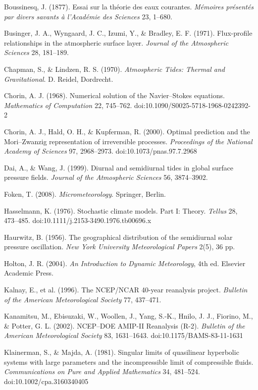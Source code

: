 \documentclass[11pt]{article}
\begin{document}
Boussinesq, J. (1877). Essai sur la th\'eorie des eaux courantes. \emph{M\'emoires pr\'esent\'es par divers savants \`a l'Acad\'emie des Sciences} 23, 1--680.

Businger, J. A., Wyngaard, J. C., Izumi, Y., \& Bradley, E. F. (1971). Flux-profile relationships in the atmospheric surface layer. \emph{Journal of the Atmospheric Sciences} 28, 181--189.

Chapman, S., \& Lindzen, R. S. (1970). \emph{Atmospheric Tides: Thermal and Gravitational}. D. Reidel, Dordrecht.

Chorin, A. J. (1968). Numerical solution of the Navier--Stokes equations. \emph{Mathematics of Computation} 22, 745--762. doi:10.1090/S0025-5718-1968-0242392-2

Chorin, A. J., Hald, O. H., \& Kupferman, R. (2000). Optimal prediction and the Mori--Zwanzig representation of irreversible processes. \emph{Proceedings of the National Academy of Sciences} 97, 2968--2973. doi:10.1073/pnas.97.7.2968

Dai, A., \& Wang, J. (1999). Diurnal and semidiurnal tides in global surface pressure fields. \emph{Journal of the Atmospheric Sciences} 56, 3874--3902.

Foken, T. (2008). \emph{Micrometeorology}. Springer, Berlin.

Hasselmann, K. (1976). Stochastic climate models. Part I: Theory. \emph{Tellus} 28, 473--485. doi:10.1111/j.2153-3490.1976.tb00696.x

Haurwitz, B. (1956). The geographical distribution of the semidiurnal solar pressure oscillation. \emph{New York University Meteorological Papers} 2(5), 36 pp.

Holton, J. R. (2004). \emph{An Introduction to Dynamic Meteorology}, 4th ed. Elsevier Academic Press.

Kalnay, E., et al. (1996). The NCEP/NCAR 40-year reanalysis project. \emph{Bulletin of the American Meteorological Society} 77, 437--471.

Kanamitsu, M., Ebisuzaki, W., Woollen, J., Yang, S.-K., Hnilo, J. J., Fiorino, M., \& Potter, G. L. (2002). NCEP--DOE AMIP-II Reanalysis (R-2). \emph{Bulletin of the American Meteorological Society} 83, 1631--1643. doi:10.1175/BAMS-83-11-1631

Klainerman, S., \& Majda, A. (1981). Singular limits of quasilinear hyperbolic systems with large parameters and the incompressible limit of compressible fluids. \emph{Communications on Pure and Applied Mathematics} 34, 481--524. doi:10.1002/cpa.3160340405
\end{document}
